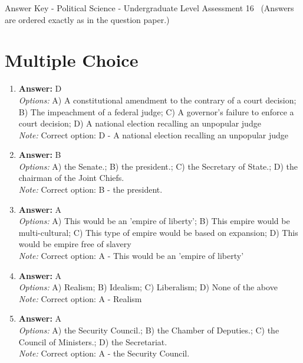 \documentclass[12pt]{article}
\begin{document}
\begin{center}
Answer Key - Political Science - Undergraduate Level Assessment 16 \
\small (Answers are ordered exactly as in the question paper.)
\end{center}

\section*{Multiple Choice}
\begin{enumerate}[label=\arabic*.]
\item \textbf{Answer:} D
\\ \textit{Options:} A) A constitutional amendment to the contrary of a court decision; B) The impeachment of a federal judge; C) A governor's failure to enforce a court decision; D) A national election recalling an unpopular judge
\\ \textit{Note:} Correct option: D - A national election recalling an unpopular judge
\item \textbf{Answer:} B
\\ \textit{Options:} A) the Senate.; B) the president.; C) the Secretary of State.; D) the chairman of the Joint Chiefs.
\\ \textit{Note:} Correct option: B - the president.
\item \textbf{Answer:} A
\\ \textit{Options:} A) This would be an 'empire of liberty'; B) This empire would be multi-cultural; C) This type of empire would be based on expansion; D) This would be empire free of slavery
\\ \textit{Note:} Correct option: A - This would be an 'empire of liberty'
\item \textbf{Answer:} A
\\ \textit{Options:} A) Realism; B) Idealism; C) Liberalism; D) None of the above
\\ \textit{Note:} Correct option: A - Realism
\item \textbf{Answer:} A
\\ \textit{Options:} A) the Security Council.; B) the Chamber of Deputies.; C) the Council of Ministers.; D) the Secretariat.
\\ \textit{Note:} Correct option: A - the Security Council.
\end{enumerate}
\end{document}
